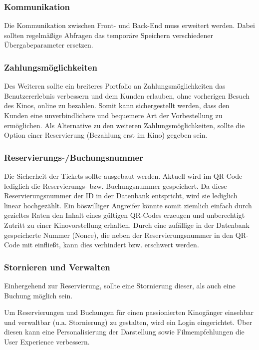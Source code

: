 \subsubsection*{Kommunikation}
\label{ssssec:kommunikation}
Die Kommunikation zwischen Front- und Back-End muss erweitert werden.
Dabei sollten regelmäßige Abfragen das temporäre Speichern verschiedener Übergabeparameter ersetzen.

\subsubsection*{Zahlungsmöglichkeiten}
\label{ssssec:zahlungsmöglichkeiten}
Des Weiteren sollte ein breiteres Portfolio an Zahlungsmöglichkeiten das Benutzererlebnis verbessern und dem Kunden erlauben, ohne vorherigen Besuch des Kinos, online zu bezahlen.
Somit kann sichergestellt werden, dass den Kunden eine unverbindlichere und bequemere Art der Vorbestellung zu ermöglichen.
Als Alternative zu den weiteren Zahlungsmöglichkeiten, sollte die Option einer Reservierung (Bezahlung erst im Kino) gegeben sein.

\subsubsection*{Reservierungs-/Buchungsnummer}
\label{ssssec:reservierungsnummer}
Die Sicherheit der Tickets sollte ausgebaut werden.
Aktuell wird im \acs{QR-Code} lediglich die Reservierungs- bzw. Buchungsnummer gespeichert.
Da diese Reservierungsnummer der ID in der Datenbank entspricht, wird sie lediglich linear hochgezählt.
Ein böswilliger Angreifer könnte somit ziemlich einfach durch gezieltes Raten den Inhalt eines gültigen \acs{QR-Code}s erzeugen und unberechtigt Zutritt zu einer Kinovorstellung erhalten.
Durch eine zufällige in der Datenbank gespeicherte Nummer (Nonce), die neben der Reservierungsnummer in den \acs{QR-Code} mit einfließt, kann dies verhindert bzw. erschwert werden.

\subsubsection*{Stornieren und Verwalten}
\label{ssssec:stornieren_und_verwalten}
Einhergehend zur Reservierung, sollte eine Stornierung dieser, als auch eine Buchung möglich sein.

Um Reservierungen und Buchungen für einen passionierten Kinogänger einsehbar und verwaltbar (u.a. Stornierung) zu gestalten, wird ein Login eingerichtet.
Über diesen kann eine Personalisierung der Darstellung sowie Filmempfehlungen die User Experience verbessern.
